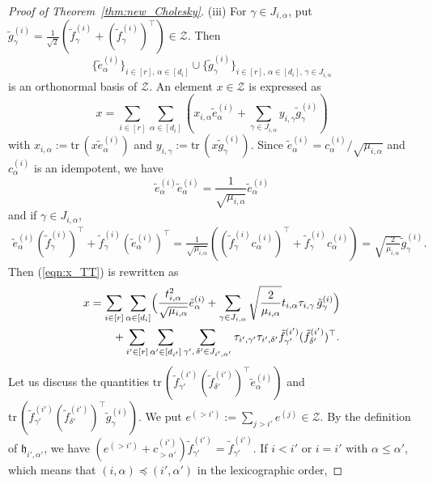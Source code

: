 \documentclass[12pt]{amsart}
\theoremstyle{plain}
\theoremstyle{definition}
\theoremstyle{remark}
\newcommand{\1}{\mathbf{1}}
\newcommand{\mytransp}[1]{ #1^{\top}}
\begin{document}
\begin{proof}[Proof of Theorem~\ref{thm:new_Cholesky}]
(iii) 
For $\gamma \in J_{i,\alpha}$, 
 put
 $\tilde{g}^{(i)}_\gamma
 = \frac{1}{\sqrt{2}} (\tilde{f}^{(i)}_\gamma + (\tilde{f}^{(i)}_\gamma)^\top) 
 \in \mathcal{Z}$. 
Then
\[
 \{\tilde{e}^{(i)}_\alpha\}_{i \in [r],\,\alpha \in [d_i]}
 \cup \{\tilde{g}^{(i)}_\gamma\}_{i \in [r],\,\alpha \in [d_i],\,\gamma\in J_{i,\alpha}}
\]
 is an orthonormal basis of
 $\mathcal{Z}$.
An element $x \in \mathcal{Z}$ is expressed as
\[ x = \sum_{i\in[r]} \sum_{\alpha\in[d_i]} 
(x_{i,\alpha} \tilde{e}^{(i)}_\alpha
 + \sum_{\gamma\in J_{i,\alpha}}
 y_{i,\gamma} \tilde{g}^{(i)}_\gamma) 
 \]
 with
 $x_{i,\alpha} := \mathrm{tr}\,(x \tilde{e}^{(i)}_\alpha)$
  and 
  $y_{i,\gamma}:= \mathrm{tr}\, (x \tilde{g}^{(i)}_\gamma)$.
Since
 $\tilde{e}^{(i)}_\alpha =  c^{(i)}_\alpha/\sqrt{\mu_{i,\alpha}}$ and $c^{(i)}_\alpha$ is an idempotent, 
 we have 
\[
\tilde e^{(i)}_\alpha \tilde e^{(i)}_\alpha 
= \frac{1}{\sqrt{\mu_{i,\alpha}}} \tilde{e}^{(i)}_\alpha
\]
and if $\gamma \in J_{i,\alpha}$,
\begin{align*}
 \tilde{e}^{(i)}_\alpha (\tilde{f}^{(i)}_\gamma)^\top
+ \tilde{f}^{(i)}_\gamma (\tilde{e}^{(i)}_\alpha)^\top 
 = \frac{1}{\sqrt{\mu_{i,\alpha}}}
( (\tilde{f}^{(i)}_\gamma c^{(i)}_\alpha)^\top + \tilde{f}^{(i)}_\gamma c^{(i)}_\alpha) = \sqrt{\frac{2}{\mu_{i,\alpha}} } \tilde{g}^{(i)}_\gamma.
\end{align*}
Then (\ref{eqn:x_TT}) is rewritten as
\begin{align*}
x&= \sum_{i \in [r]}\sum_{\alpha \in [d_i]} 
 \Bigl( \frac{t_{i,\alpha}^2}{\sqrt{\mu_{i,\alpha}} }  \tilde{e}^{(i)}_\alpha 
 + \sum_{\gamma\in J_{i,\alpha}} \sqrt{\frac{2}{\mu_{i,\alpha}} } t_{i,\alpha} \tau_{i,\gamma} \,\tilde{g}^{(i)}_\gamma \Bigr)\\ 
 &\qquad + \sum_{i' \in [r]}\sum_{\alpha' \in [d_{i'}]} \sum_{\gamma',\,\delta' \in J_{i',\alpha'} } 
   \tau_{i',\gamma'} \tau_{i',\delta'}  \tilde{f}^{(i')}_{\gamma'} \mytransp{ (\tilde{f}^{(i')}_{\delta'}) }.
 \end{align*}  
Let us discuss the quantities
 $\mathrm{tr}\,( \tilde{f}^{(i')}_{\gamma'} \mytransp{ (\tilde{f}^{(i')}_{\delta'}) } \tilde{e}^{(i)}_\alpha)$
 and 
 $\mathrm{tr}\,( \tilde{f}^{(i')}_{\gamma'} \mytransp{ (\tilde{f}^{(i')}_{\delta'}) } \tilde{g}^{(i)}_\gamma)$.
We put $e^{(>i')} := \sum_{j >i'} e^{(j)} \in \mathcal{Z}$. 
By the definition of $\mathfrak{h}_{i',\alpha'}$, 
 we have $(e^{(>i')} + c^{(i')}_{> \alpha'}) \tilde{f}^{(i')}_{\gamma'} = \tilde{f}^{(i')}_{\gamma'}$.
If $i < i'$ or $i = i'$ with $\alpha \le \alpha'$,
 which means that $(i, \alpha) \preceq (i', \alpha')$ in the lexicographic order, 

\end{proof}
\end{document}
